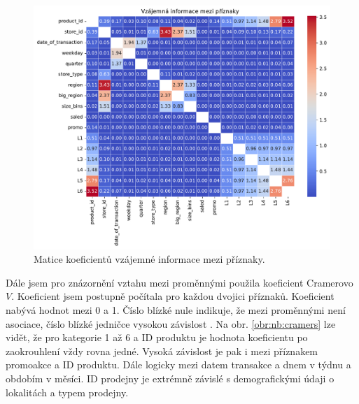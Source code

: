 \begin{figure}[h!]
    \centering
    \includegraphics[width=\textwidth]{obrazky/pripravadat/matrix_MI-everything-SFF-storesFETURES-002.pdf}
    \caption{Matice koeficientů vzájemné informace mezi příznaky.}
    \label{obr:nb:MI}
\end{figure}

Dále jsem pro znázornění vztahu mezi proměnnými použila koeficient Cramerovo $V$. Koeficient jsem postupně počítala pro každou dvojici příznaků. Koeficient nabývá hodnot mezi 0 a 1. Číslo blízké nule indikuje, že mezi proměnnými není asociace, číslo blízké jedničce vysokou závislost \cite{bib:statology}. Na obr. \ref*{obr:nb:cramers} lze vidět, že pro kategorie 1 až 6 a ID produktu je hodnota koeficientu po zaokrouhlení vždy rovna jedné. Vysoká závislost je pak i mezi příznakem promoakce a ID produktu. Dále logicky mezi datem transakce a dnem v týdnu a obdobím v měsíci. ID prodejny je extrémně závislé s demografickými údaji o lokalitách a typem prodejny.

